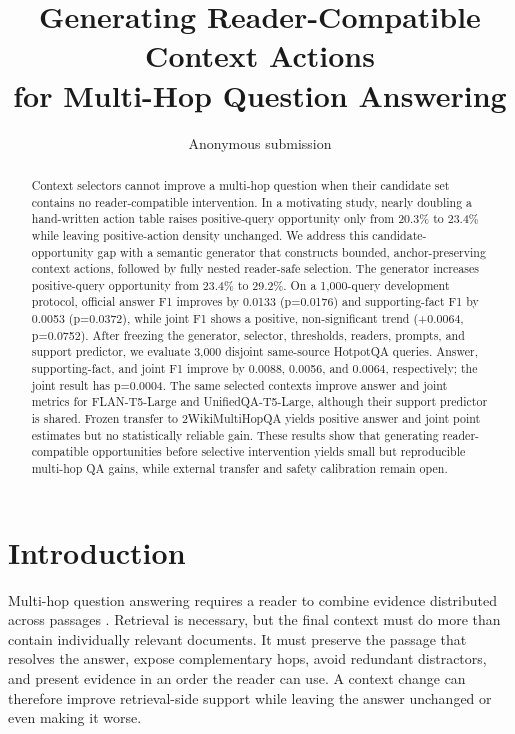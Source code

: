 \documentclass[10pt,twocolumn]{article}
\title{Generating Reader-Compatible Context Actions\\
for Multi-Hop Question Answering}
\author{Anonymous submission}
\date{}
\begin{document}
\maketitle

\begin{abstract}
Context selectors cannot improve a multi-hop question when their candidate set contains no reader-compatible intervention. In a motivating study, nearly doubling a hand-written action table raises positive-query opportunity only from 20.3\% to 23.4\% while leaving positive-action density unchanged. We address this candidate-opportunity gap with a semantic generator that constructs bounded, anchor-preserving context actions, followed by fully nested reader-safe selection. The generator increases positive-query opportunity from 23.4\% to 29.2\%. On a 1,000-query development protocol, official answer F1 improves by 0.0133 (p=0.0176) and supporting-fact F1 by 0.0053 (p=0.0372), while joint F1 shows a positive, non-significant trend (+0.0064, p=0.0752). After freezing the generator, selector, thresholds, readers, prompts, and support predictor, we evaluate 3,000 disjoint same-source HotpotQA queries. Answer, supporting-fact, and joint F1 improve by 0.0088, 0.0056, and 0.0064, respectively; the joint result has p=0.0004. The same selected contexts improve answer and joint metrics for FLAN-T5-Large and UnifiedQA-T5-Large, although their support predictor is shared. Frozen transfer to 2WikiMultiHopQA yields positive answer and joint point estimates but no statistically reliable gain. These results show that generating reader-compatible opportunities before selective intervention yields small but reproducible multi-hop QA gains, while external transfer and safety calibration remain open.
\end{abstract}

\section{Introduction}

Multi-hop question answering requires a reader to combine evidence distributed across passages \citep{yang-etal-2018-hotpotqa,ho-etal-2020-2wiki}. Retrieval is necessary, but the final context must do more than contain individually relevant documents. It must preserve the passage that resolves the answer, expose complementary hops, avoid redundant distractors, and present evidence in an order the reader can use. A context change can therefore improve retrieval-side support while leaving the answer unchanged or even making it worse.
\end{document}
